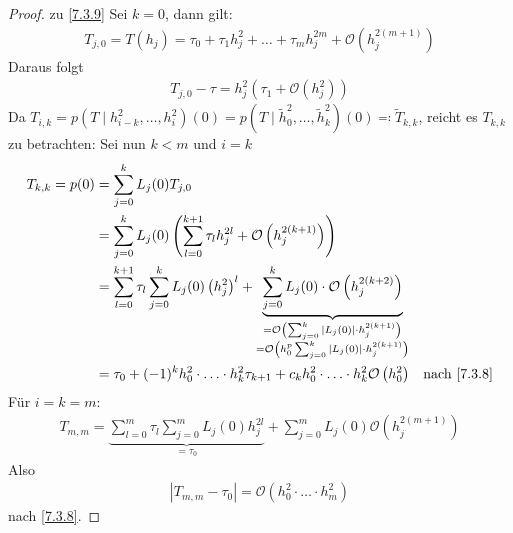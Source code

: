 \begin{proof}
  zu \ref{7.3.9}
  Sei $k=0$, dann gilt:
  \begin{gather*}
    T_{j,0} = T(h_j) = \tau_0+\tau_1h_j^2+\ldots+\tau_mh_j^{2m} 
    +\mathcal{O}\left(h_j^{2(m+1)}\right)
  \end{gather*}
  Daraus folgt
  \begin{gather*}
    T_{j,0}-\tau=h_j^2\left(\tau_1+\mathcal{O}( h_j^2)\right)
  \end{gather*}
  Da $T_{i,k}=p(T\mid h_{i-k}^2,\ldots,h_i^2)(0)
  =p(T\mid \widetilde{h}_0^2,\ldots,\widetilde{h}_k^2)(0)
  \eqqcolon \widetilde{T}_{k,k}$, reicht es $T_{k,k}$ zu betrachten:
  Sei nun $k<m$ und $i=k$
  \begin{align*}
    T_{k,k} = p(0) &= \sum_{j=0}^kL_j(0)T_{j,0} \\
                   &= \sum_{j=0}^kL_j(0)\left(
                     \sum_{l=0}^{k+1}\tau_lh_j^{2l}+\mathcal{O}\left(
                     h_j^{2(k+1)}\right)\right)\\
                   &= \sum_{l=0}^{k+1}\tau_l\sum_{j=0}^kL_j(0)\left(h_j^2\right)^l
                     + \underbrace{\sum_{j=0}^kL_j(0)
                     \cdot \mathcal{O}\left(h_j^{2(k+2)}\right)
                     }_{\substack{
                     =\mathcal{O}\left(
                     \sum_{j=0}^k|L_j(0)|\cdot h_j^{2(k+1)}\right) \\
    =\mathcal{O}\left(h_0^p\sum_{j=0}^k|L_j(0)|\cdot h_j^{2(k+1)}\right)
    }}\\
                   &=\tau_0 + (-1)^kh_0^2\cdot\ldots\cdot
                     h_k^2\tau_{k+1}
                     +c_kh_0^2\cdot\ldots\cdot
                     h_k^2\mathcal{O}\left(h_0^2\right)
                   &\text{nach \ref{7.3.8}}
  \end{align*}
  Für $i=k=m$:
  \begin{gather*}
    T_{m,m}=\underbrace{
      \sum_{l=0}^m\tau_l\sum_{j=0}^m
      L_j(0)h_j^{2l}
    }_{=\tau_0}
    +\sum_{j=0}^m L_j(0)\mathcal{O}\left(h_j^{2(m+1)}\right)
  \end{gather*}
  Also 
  \begin{gather*}
    \left| T_{m,m}-\tau_0\right| = \mathcal{O}\left(h_0^2\cdot
      \ldots\cdot h_m^2\right)
  \end{gather*}
  nach \ref{7.3.8}.
\end{proof}


